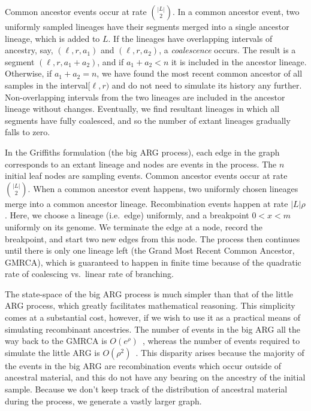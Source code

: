 \documentclass{article}
\begin{document}
Common ancestor events occur at rate $\binom{|L|}{2}$.
In a common ancestor event, two uniformly sampled lineages have their segments
merged into a single ancestor lineage, which is added to $L$.
If the lineages have overlapping intervals of ancestry,
say, $(\ell, r, a_1)$ and $(\ell, r, a_2)$, a
\emph{coalescence} occurs. The result is a segment
$(\ell, r, a_1 + a_2)$, and if $a_1 + a_2 < n$ it is included in the
ancestor lineage. Otherwise, if $a_1 + a_2 = n$, we have found
the most recent common ancestor of all samples in the interval$[\ell, r)$
and do not need to simulate its history any further.
Non-overlapping intervals from the two lineages are included
 in the ancestor lineage without changes. Eventually,
we find resultant lineages in which all segments have fully coalesced,
and so the number of extant lineages gradually falls to zero.

In the Griffiths formulation (the big ARG process), each edge in the graph corresponds to an extant
lineage and nodes are events in the process. The $n$ initial leaf nodes are
sampling events. Common ancestor events occur at rate $\binom{|L|}{2}$.
When a common ancestor event happens, two uniformly chosen lineages
merge into a common ancestor lineage.
Recombination events happen at rate $|L| \rho$. Here, we choose a lineage (i.e.\ edge) uniformly,
and a breakpoint $0 < x < m$ uniformly on its genome. We terminate the edge at a
node, record the breakpoint, and start two new edges from this node. The process
then continues until there is only one lineage left (the Grand Most Recent
Common Ancestor, GMRCA), which is guaranteed to
happen in finite time because of the quadratic rate of coalescing vs.\ linear rate of branching.

The state-space of the big ARG process is much simpler than that of the little ARG process,
which greatly facilitates mathematical reasoning. This simplicity comes at a
substantial cost, however, if we wish to use it as a practical means of
simulating recombinant ancestries.
The number of events in the big ARG all the way back to the GMRCA
is $O(e^\rho)$~\citep{griffiths1997ancestral}, whereas the number
of events required to simulate the little ARG is
$O(\rho^2)$~\citep{hein2004gene,baumdicker2021efficient}.
This disparity arises because the majority of the events in the big ARG are
recombination events which occur outside of ancestral material,
and this do not have any bearing on the ancestry of the initial sample.
Because we don't keep track of the distribution of ancestral material during the process,
we generate a vastly larger graph.
\end{document}
